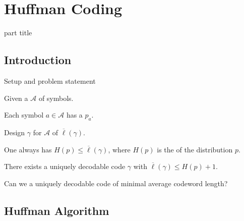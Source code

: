 \section{Huffman Coding}


\begin{frame}
 \vspace{8.0ex}
\begin{center}
\begin{beamercolorbox}[sep=12pt,center]{part title}
\insertsection\par
\end{beamercolorbox}
\end{center}
\end{frame}

\subsection{Introduction}

\begin{frame}{Setup and problem statement}
\bit
\item Given a  $\mathcal{A}$ of symbols.
\item Each symbol $a\in\mathcal{A}$ has a   $p_a$.
\item {} Design  $\gamma$ for $\mathcal{A}$ of  $\overline{\ell}(\gamma)$. 
\eit

\bit
\item One always has $H(p)\leq \overline{\ell}(\gamma)$, where $H(p)$ is the  of the distribution $p$. 
\item There exists a uniquely decodable code $\gamma$ with $\overline{\ell}(\gamma)\leq H(p)+1$. 
\eit


\bit
\item Can we  a uniquely decodable code of minimal average codeword length? 
\eit

\end{frame}

\subsection{Huffman Algorithm}

